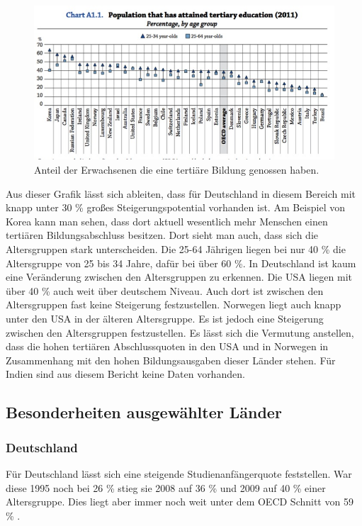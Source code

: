 \begin{figure}[H]
\includegraphics[width=15cm]{./images/tertiary.jpg}
\center
\caption{Anteil der Erwachsenen die eine tertiäre Bildung genossen haben. \cite[26]{oecd5} }
\end{figure}
Aus dieser Grafik lässt sich ableiten, dass für Deutschland in diesem Bereich mit knapp unter 30 \% großes Steigerungspotential vorhanden ist.
Am Beispiel von Korea kann man sehen, dass dort aktuell wesentlich mehr Menschen einen tertiären Bildungsabschluss besitzen. Dort sieht man auch, dass sich die Altersgruppen stark unterscheiden. Die 25-64 Jährigen liegen bei nur 40 \% die Altersgruppe von 25 bis 34 Jahre, dafür bei über 60 \%. In Deutschland ist kaum eine Veränderung zwischen den Altersgruppen zu erkennen.
Die USA liegen mit über 40 \% auch weit über deutschem Niveau. Auch dort ist zwischen den Altersgruppen fast keine Steigerung festzustellen.
Norwegen liegt auch knapp unter den USA in der älteren Altersgruppe.  Es ist jedoch eine Steigerung zwischen den Altersgruppen festzustellen. Es lässt sich die Vermutung anstellen, dass die hohen tertiären Abschlussquoten in den USA und in Norwegen in Zusammenhang mit den hohen Bildungsausgaben dieser Länder stehen.
Für Indien sind aus diesem Bericht keine Daten vorhanden.

\subsection{Besonderheiten ausgewählter Länder}
\subsubsection*{Deutschland}
Für Deutschland lässt sich eine steigende Studienanfängerquote feststellen. War diese 1995 noch bei 26 \%  stieg sie 2008 auf 36 \%  und 2009 auf 40 \% einer Altersgruppe. Dies liegt aber immer noch  weit unter dem OECD Schnitt von 59 \% .

